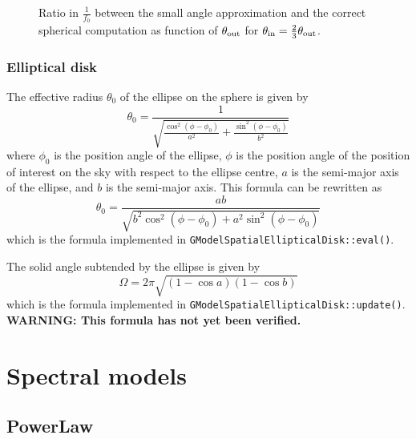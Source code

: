 \documentclass{article}[12pt,a4]
\begin{document}
\begin{figure}
  \center
 \caption{Ratio in $\frac{1}{f_0}$ between the small angle approximation and the correct 
spherical computation as function of $\theta_{\rm out}$ for
$\theta_{\rm in} = \frac{2}{3}\theta_{\rm out}$.}
 \label{fig:shellfunction}
\end{figure}


\subsubsection{Elliptical disk}

The effective radius $\theta_0$ of the ellipse on the sphere is given by
\begin{equation}
\theta_0 = \frac{1}{\sqrt{\frac{\cos^2(\phi-\phi_0)}{a^2} + \frac{\sin^2(\phi-\phi_0)}{b^2}}}
\end{equation}
where
$\phi_0$ is the position angle of the ellipse,
$\phi$ is the position angle of the position of interest on the sky with respect to the ellipse centre,
$a$ is the semi-major axis of the ellipse, and
$b$ is the semi-major axis.
This formula can be rewritten as
\begin{equation}
\theta_0 = \frac{ab}{\sqrt{b^2 \cos^2(\phi-\phi_0) + a^2 \sin^2(\phi-\phi_0)}}
\end{equation}
which is the formula implemented in {\tt GModelSpatialEllipticalDisk::eval()}.

The solid angle subtended by the ellipse is given by 
\begin{equation}
\Omega = 2 \pi \sqrt{(1-\cos a) (1-\cos b)}
\end{equation}
which is the formula implemented in {\tt GModelSpatialEllipticalDisk::update()}.
{\bf WARNING: This formula has not yet been verified.}


\section{Spectral models}

\subsection{PowerLaw}
\end{document}
